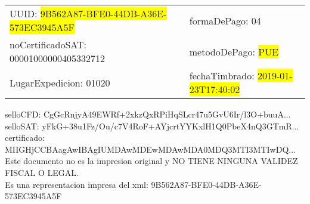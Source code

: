 \documentclass{article}
\begin{document}
\begin{tabular}{p{11cm}p{1cm}p{8cm}}
\bigskip
UUID: \colorbox{yellow}{ 9B562A87-BFE0-44DB-A36E-573EC3945A5F } & & formaDePago: 04\\

noCertificadoSAT: 00001000000405332712 & & metodoDePago: \colorbox{yellow}{ PUE }\\

LugarExpedicion: 01020 & & fechaTimbrado: \colorbox{yellow}{ 2019-01-23T17:40:02 } \\
\end{tabular}

\bigskip
selloCFD: CgGcRnjyA49EWRf+2xkzQxRPiHqSLcr47u5GvU6Ir/l3O+buuA... \\
selloSAT: yFkG+38u1Fz/Ou/c7V4RoF+AYjcrtYYKxlH1Q0PbeX4nQ3GTmR... \\

certificado: MIIGHjCCBAagAwIBAgIUMDAwMDEwMDAwMDA0MDQ3MTI3MTIwDQ...\bigskip\bigskip\bigskip\bigskip\bigskip\bigskip
\\Este documento no es la impresion original y NO TIENE NINGUNA VALIDEZ FISCAL O LEGAL. \\
 Es una representacion impresa del xml:  9B562A87-BFE0-44DB-A36E-573EC3945A5F \\
\end{document}

